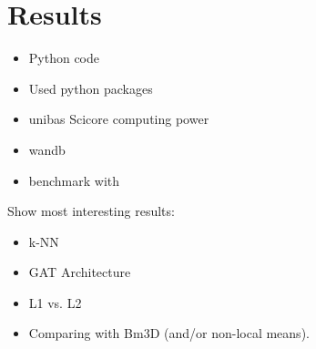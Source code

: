 \chapter{Results}
\label{sec:results}

\begin{itemize}
  \item Python code
  \item Used python packages
  \item unibas Scicore computing power
  \item wandb\cite{wandb}
  \item benchmark with \cite{bm3d}
\end{itemize}


Show most interesting results:
\begin{itemize}
  \item k-NN
  \item GAT Architecture
  \item L1 vs. L2
  \item Comparing with Bm3D (and/or non-local means).
\end{itemize}
